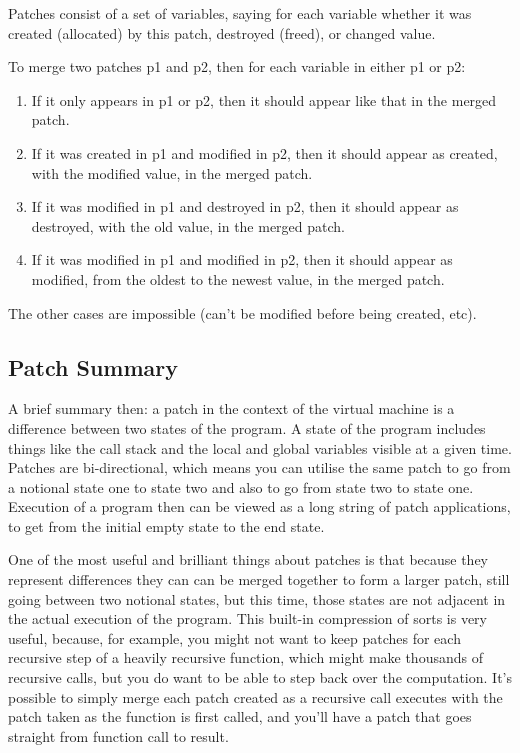\documentclass[10pt,a4paper]{report}
\begin{document}
Patches consist of a set of variables, saying for each variable whether it was created (allocated) by this patch, destroyed (freed), or changed value.

To merge two patches p1 and p2, then for each variable in either p1 or p2:

\begin{enumerate}
\item If it only appears in p1 or p2, then it should appear like that in the merged patch.
\item If it was created in p1 and modified in p2, then it should appear as created, with the modified value, in the merged patch.
\item If it was modified in p1 and destroyed in p2, then it should appear as destroyed, with the old value, in the merged patch.
\item If it was modified in p1 and modified in p2, then it should appear as modified, from the oldest to the newest value, in the merged patch. 
\end{enumerate}

The other cases are impossible (can't be modified before being created, etc). 

\subsection{Patch Summary}
A brief summary then: a patch in the context of the virtual machine is a difference between two states of the program. A state of the program includes things like the call stack and the local and global variables visible at a given time. Patches are bi-directional, which means you can utilise the same patch to go from a notional state one to state two and also to go from state two to state one. Execution of a program then can be viewed as a long string of patch applications, to get from the initial empty state to the end state. 

One of the most useful and brilliant things about patches is that because they represent differences they can can be merged together to form a larger patch, still going between two notional states, but this time, those states are not adjacent in the actual execution of the program. This built-in compression of sorts is very useful, because, for example, you might not want to keep patches for each recursive step of a heavily recursive function, which might make thousands of recursive calls, but you do want to be able to step back over the computation. It's possible to simply merge each patch created as a recursive call executes with the patch taken as the function is first called, and you'll have a patch that goes straight from function call to result.
\end{document}
